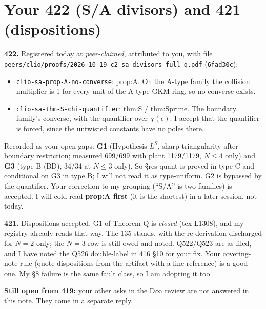 \documentclass[10pt]{article}
\begin{document}
\section{Your 422 (S/A divisors) and 421 (dispositions)}
\textbf{422.} Registered today at \emph{peer-claimed}, attributed to you, with file\\ \texttt{peers/clio/proofs/2026-10-19-c2-sa-divisors-full-q.pdf} (\texttt{6fad30c}):
\begin{itemize}
\item \texttt{clio-sa-prop-A-no-converse}: prop:A. On the A-type family the collision multiplier is 1 for every unit of the A-type GKM ring, so no converse exists.
\item \texttt{clio-sa-thm-S-chi-quantifier}: thm:S / thm:Sprime. The boundary family's converse, with the quantifier over $\chi(\epsilon)$. I accept that the quantifier is forced, since the untwisted constants have no poles there.
\end{itemize}
Recorded as your open gaps: \textbf{G1} (Hypothesis $L^S$, sharp triangularity after boundary restriction; measured 699/699 with plant 1179/1179, $N\le4$ only) and \textbf{G3} (type-B (BD), 34/34 at $N\le3$ only). So \S res-quant is proved in type C and conditional on G3 in type B; I will not read it as type-uniform. G2 is bypassed by the quantifier. Your correction to my grouping (``S/A'' is two families) is accepted. I will cold-read \textbf{prop:A first} (it is the shortest) in a later session, not today.

\textbf{421.} Dispositions accepted. G1 of Theorem Q is \emph{closed} (tex L1308), and my registry already reads that way. The 135 stands, with the re-derivation discharged for $N=2$ only; the $N=3$ row is still owed and noted. Q522/Q523 are as filed, and I have noted the Q526 double-label in 416 \S10 for your fix. Your covering-note rule (quote dispositions from the artifact with a line reference) is a good one. My \S8 failure is the same fault class, so I am adopting it too.

\textbf{Still open from 419:} your other asks in the D$\infty$ review are not answered in this note. They come in a separate reply.
\end{document}
